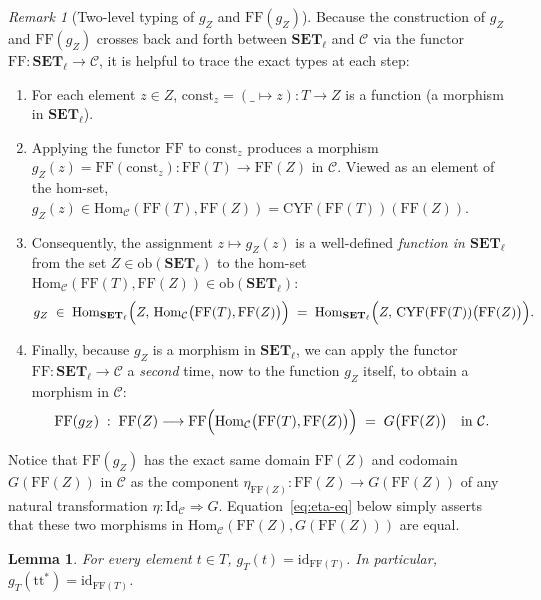 \documentclass[11pt,a4paper]{article}
\newtheorem{lemma}[theorem]{Lemma}
\theoremstyle{definition}
\theoremstyle{remark}
\newtheorem{remark}[theorem]{Remark}
\newcommand{\Set}{\mathbf{SET}}
\newcommand{\Hom}{\mathrm{Hom}}
\newcommand{\Id}{\mathrm{Id}}
\newcommand{\id}{\mathrm{id}}
\newcommand{\CYF}{\mathrm{CYF}}
\newcommand{\FF}{\mathrm{FF}}
\newcommand{\ttstar}{\mathrm{tt}^*}
\newcommand{\const}{\mathrm{const}}
\begin{document}
\begin{remark}[Two-level typing of $g_Z$ and $\FF(g_Z)$]\label{rem:g-typing}
Because the construction of $g_Z$ and $\FF(g_Z)$ crosses back and forth between $\Set_\ell$ and
$\mathcal{C}$ via the functor $\FF : \Set_\ell \to \mathcal{C}$, it is helpful to trace the exact types
at each step:
\begin{enumerate}[label=(\arabic*),nosep]
  \item For each element $z \in Z$, $\const_z = (\_ \mapsto z) : T \to Z$ is a function (a morphism in
  $\Set_\ell$).
\vspace{4 pt}
  \item Applying the functor $\FF$ to $\const_z$ produces a morphism
  $g_Z(z) = \FF(\const_z) : \FF(T) \to \FF(Z)$ in $\mathcal{C}$. Viewed as an element of the hom-set,
  $g_Z(z) \in \Hom_{\mathcal{C}}(\FF(T), \FF(Z)) = \CYF(\FF(T))(\FF(Z))$.
\vspace{4 pt}
  \item Consequently, the assignment $z \mapsto g_Z(z)$ is a well-defined \emph{function in $\Set_\ell$}
  from the set $Z \in \mathrm{ob}(\Set_\ell)$ to the hom-set
  $\Hom_{\mathcal{C}}(\FF(T), \FF(Z)) \in \mathrm{ob}(\Set_\ell)$:
  \[
    g_Z \;\in\; \Hom_{\Set_\ell}\Bigl(Z,\, \Hom_{\mathcal{C}}\bigl(\FF(T), \FF(Z)\bigr)\Bigr)
    \;=\; \Hom_{\Set_\ell}\Bigl(Z,\, \CYF(\FF(T))\bigl(\FF(Z)\bigr)\Bigr).
  \]
\vspace{4 pt}
  \item Finally, because $g_Z$ is a morphism in $\Set_\ell$, we can apply the functor
  $\FF : \Set_\ell \to \mathcal{C}$ a \emph{second} time, now to the function $g_Z$ itself, to obtain
  a morphism in $\mathcal{C}$:
  \[
    \FF(g_Z) \;:\; \FF(Z) \longrightarrow \FF\Bigl(\Hom_{\mathcal{C}}\bigl(\FF(T), \FF(Z)\bigr)\Bigr)
    \;=\; G\bigl(\FF(Z)\bigr)
    \quad\text{in }\mathcal{C}.
  \]
\end{enumerate}
Notice that $\FF(g_Z)$ has the exact same domain $\FF(Z)$ and codomain $G(\FF(Z))$ in $\mathcal{C}$ as
the component $\eta_{\FF(Z)} : \FF(Z) \to G(\FF(Z))$ of any natural transformation
$\eta : \Id_{\mathcal{C}} \Rightarrow G$. Equation~\eqref{eq:eta-eq} below simply asserts that these two
morphisms in $\Hom_{\mathcal{C}}(\FF(Z), G(\FF(Z)))$ are equal.
\end{remark}

\begin{lemma}\label{lem:g-id}
For every element $t \in T$, $g_T(t) = \id_{\FF(T)}$. In particular, $g_T(\ttstar) = \id_{\FF(T)}$.
\end{lemma}
\end{document}
